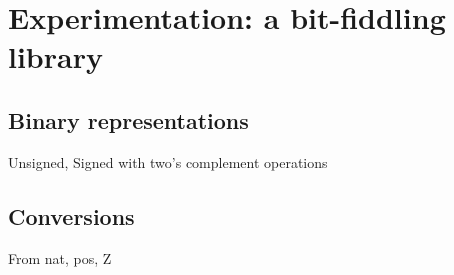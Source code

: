 \section{Experimentation: a bit-fiddling library}

\subsection{Binary representations}

Unsigned, Signed with two's complement operations

\subsection{Conversions}

From nat, pos, Z


